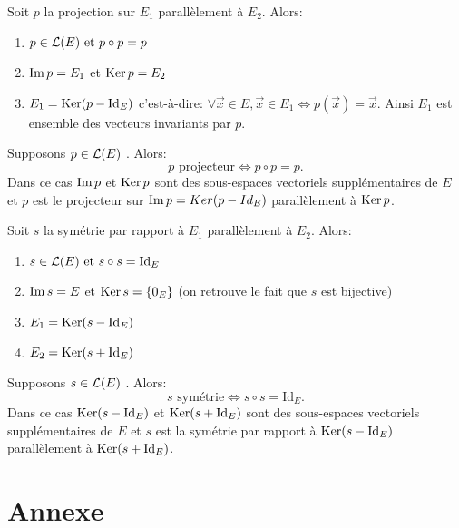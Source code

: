\documentclass{book}
\begin{document}
\begin{Proposition}[Propriétés] Soit $p$ la projection sur $E_1$ parallèlement à $E_2$. Alors:
\begin{enumerate}
\item $p \in   \mathcal{L}(E)\text{ et }p \circ p = p$
\item $\operatorname{Im} p = E_1$ et $\operatorname{Ker} p = E_2$
\item $E_1 = \operatorname{Ker}(p - \mathrm{Id}_E)$ c'est-à-dire: $\forall   \vec{x} \in   E,\vec{ x }\in   E_1 \Leftrightarrow p(\vec{x}) = \vec{x}.$ Ainsi $E_1$ est ensemble des vecteurs invariants par $p$.
\end{enumerate}
\end{Proposition}
\begin{Proposition}[Caractérisation] Supposons $p \in   \mathcal{L}(E)$ . Alors:
$$p\text{ projecteur} \Leftrightarrow p \circ p = p.$$
Dans ce cas $\operatorname{Im} p$ et $\operatorname{Ker} p$ sont des sous-espaces vectoriels supplémentaires de $E$ et $p$ est le projecteur sur $\operatorname{Im} p =
Ker(p - Id_E)$ parallèlement à $\operatorname{Ker} p$.
\end{Proposition}
\begin{Proposition}[Propriétés] Soit $s$ la symétrie par rapport à $E_1$ parallèlement à $E_2$. Alors:
\begin{enumerate}
\item $s \in   \mathcal{L}(E)\text{ et }s \circ s = \mathrm{Id}_E$
\item $\operatorname{Im} s = E$ et $\operatorname{Ker} s = \{0_E\}$ (on retrouve le fait que $s$ est bijective)
\item $E_1 = \operatorname{Ker}(s - \mathrm{Id}_E)$
\item $E_2 = \operatorname{Ker}(s + \mathrm{Id}_E)$
\end{enumerate}
\end{Proposition}
\begin{Proposition}[Caractérisation] Supposons $s \in   \mathcal{L}(E)$ . Alors:
$$s\text{ symétrie} \Leftrightarrow s \circ s = \mathrm{Id}_E.$$
Dans ce cas $\operatorname{Ker}(s - \mathrm{Id}_E)$ et $\operatorname{Ker}(s + \mathrm{Id}_E)$ sont des sous-espaces vectoriels supplémentaires de $E$ et $s$ est la symétrie
par rapport à $\operatorname{Ker}(s - \mathrm{Id}_E)$ parallèlement à $\operatorname{Ker}(s + \mathrm{Id}_E)$.
\end{Proposition}





\section{Annexe}
\end{document}
